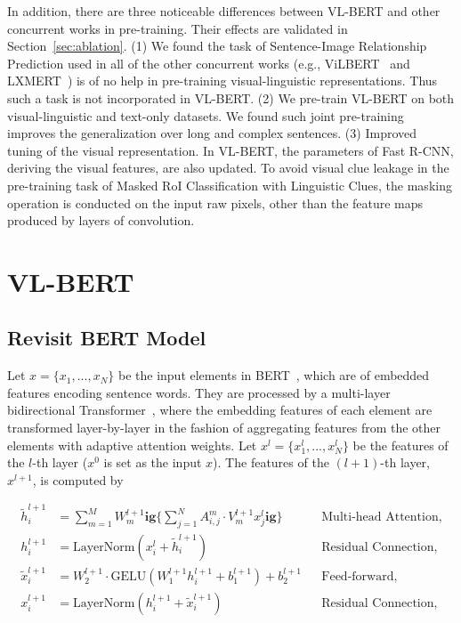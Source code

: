 In addition, there are three noticeable differences between VL-BERT and other concurrent works in pre-training. Their effects are validated in Section~\ref{sec:ablation}. (1) We found the task of Sentence-Image Relationship Prediction used in all of the other concurrent works (e.g., ViLBERT~\citep{lu2019vilbert} and LXMERT~\citep{tan2019lxmert}) is of no help in pre-training visual-linguistic representations. Thus such a task is not incorporated in VL-BERT. (2) We pre-train VL-BERT on both visual-linguistic and text-only datasets. We found such joint pre-training improves the generalization over long and complex sentences. (3) Improved tuning of the visual representation. In VL-BERT, the parameters of Fast R-CNN, deriving the visual features, are also updated. To avoid visual clue leakage in the pre-training task of Masked RoI Classification with Linguistic Clues, the masking operation is conducted on the input raw pixels, other than the feature maps produced by layers of convolution.

\section{VL-BERT}

\subsection{Revisit BERT Model}

Let $x = \{x_1, ..., x_N\}$ be the input elements in BERT~\citep{devlin2018bert}, which are of embedded features encoding sentence words. They are processed by a multi-layer bidirectional Transformer~\citep{vaswani2017transformer}, where the embedding features of each element are transformed layer-by-layer in the fashion of aggregating features from the other elements with adaptive attention weights. Let $x^l = \{x^l_1, ..., x^l_N\}$ be the features of the $l$-th layer ($x^0$ is set as the input $x$). The features of the $(l+1)$-th layer, $x^{l+1}$, is computed by

\begin{align}
\tilde{h}^{l+1}_i &= \sum_{m=1}^{M} W^{l+1}_m  \mathbf{ig}\{ \sum_{j=1}^{N} A^{m}_{i,j} \cdot V_m^{l+1} x_j^l \mathbf{ig}\} && \text{Multi-head Attention,} \label{eq:multi_head} \\
h^{l+1}_i &= \text{LayerNorm} (x^l_i + \tilde{h}^{l+1}_i) && \text{Residual Connection,}  \\
\tilde{x}^{l+1}_i &= W_2^{l+1}\cdot\text{GELU} ( W_1^{l+1} h^{l+1}_i + b_1^{l+1} ) + b_2^{l+1} && \text{Feed-forward,} \label{eq:feedfoward} \\
x^{l+1}_i &= \text{LayerNorm} (h^{l+1}_i + \tilde{x}^{l+1}_i) && \text{Residual Connection,} \label{eq:ffn}
\end{align}

